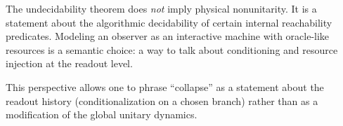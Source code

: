 \begin{remark}
\label{rem:layer_separation}
The undecidability theorem does \emph{not} imply physical nonunitarity.
It is a statement about the algorithmic decidability of certain internal reachability predicates.
Modeling an observer as an interactive machine with oracle-like resources is a semantic choice: a way to talk about conditioning and resource injection at the readout level.
\end{remark}

This perspective allows one to phrase ``collapse'' as a statement about the readout history (conditionalization on a chosen branch) rather than as a modification of the global unitary dynamics.
